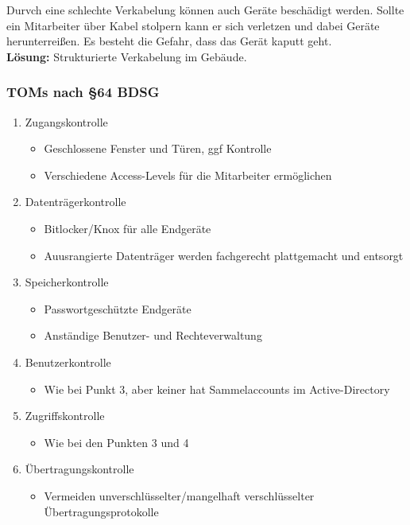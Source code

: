 \documentclass[a4paper, 12pt]{report}
\begin{document}
\begin{multicols}{2}
Durvch eine schlechte Verkabelung können auch Geräte beschädigt werden. Sollte
ein Mitarbeiter über Kabel stolpern kann er sich verletzen und dabei Geräte 
herunterreißen. Es besteht die Gefahr, dass das Gerät kaputt geht. \\

\textbf{Lösung:} Strukturierte Verkabelung im Gebäude.

\subsubsection{TOMs nach \S64 BDSG}

\begin{enumerate}
	\item Zugangskontrolle
		\begin{itemize}
			\item Geschlossene Fenster und Türen, ggf Kontrolle
			\item Verschiedene Access-Levels für die Mitarbeiter
				ermöglichen
		\end{itemize}
	\item Datenträgerkontrolle
		\begin{itemize}
			\item Bitlocker/Knox für alle Endgeräte
			\item Auusrangierte Datenträger werden fachgerecht 
				plattgemacht und entsorgt
		\end{itemize}
	\item Speicherkontrolle
		\begin{itemize}
			\item Passwortgeschützte Endgeräte
			\item Anständige Benutzer- und Rechteverwaltung
		\end{itemize}
	\item Benutzerkontrolle
		\begin{itemize}
			\item Wie bei Punkt 3, aber keiner hat Sammelaccounts
				im Active-Directory
		\end{itemize}
	\item Zugriffskontrolle
		\begin{itemize}
			\item Wie bei den Punkten 3 und 4
		\end{itemize}
	\item Übertragungskontrolle
		\begin{itemize}
			\item Vermeiden unverschlüsselter/mangelhaft 
				verschlüsselter Übertragungsprotokolle

\end{itemize}
\end{enumerate}
\end{multicols}
\end{document}
